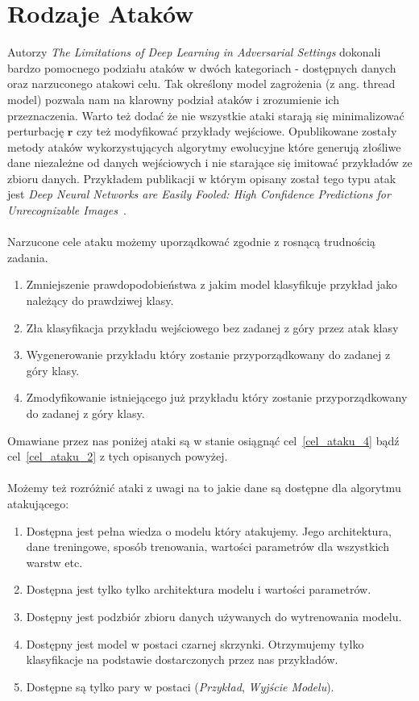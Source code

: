 \documentclass[
    left=2.5cm,         %
    right=2.5cm,        %
    top=2.5cm,          %
    bottom=3cm,         %
    bindingoffset=6mm,  %
    nohyphenation=false %
]{eiti/eiti-thesis}
\renewcommand{\vec}[1]{\mathbf{#1}}
\begin{document}
\section{Rodzaje Ataków}
Autorzy
\textit{The Limitations of Deep Learning in Adversarial Settings}\cite{DBLP:journals/corr/PapernotMJFCS15}
dokonali bardzo pomocnego podziału ataków w dwóch kategoriach - dostępnych danych oraz narzuconego atakowi celu. Tak określony
model zagrożenia (z ang. thread model) pozwala nam na klarowny podział ataków i zrozumienie ich przeznaczenia. Warto też dodać
że nie wszystkie ataki starają się minimalizować perturbację $\vec{r}$ czy też modyfikować przykłady wejściowe. Opublikowane zostały
metody ataków wykorzystujących algorytmy ewolucyjne które generują złośliwe dane niezależne od danych wejściowych i nie starające się
imitować przykładów ze zbioru danych. Przykładem publikacji w którym opisany został tego typu atak jest \textit{Deep Neural Networks are Easily Fooled: High Confidence Predictions for Unrecognizable Images}~\cite{DBLP:journals/corr/NguyenYC14}.
\\~\\
Narzucone cele ataku możemy uporządkować zgodnie z rosnącą trudnością zadania.
\begin{enumerate}
    \item Zmniejszenie prawdopodobieństwa z jakim model klasyfikuje przykład jako należący do prawdziwej klasy.
    \item \label{cel_ataku_2} Zła klasyfikacja przykładu wejściowego bez zadanej z góry przez atak klasy
    \item Wygenerowanie przykładu który zostanie przyporządkowany do zadanej z góry klasy.
    \item \label{cel_ataku_4} Zmodyfikowanie istniejącego już przykładu który zostanie przyporządkowany do zadanej z góry klasy.
\end{enumerate}
Omawiane przez nas poniżej ataki są w stanie osiągnąć cel~\ref{cel_ataku_4} bądź cel~\ref{cel_ataku_2} z tych opisanych powyżej.
\\~\\
Możemy też rozróżnić ataki z uwagi na to jakie dane są dostępne dla algorytmu atakującego:
\begin{enumerate}
    \item \label{atak_1} Dostępna jest pełna wiedza o modelu który atakujemy. Jego architektura, dane treningowe, sposób trenowania, wartości parametrów dla wszystkich warstw etc.
    \item \label{atak_2} Dostępna jest tylko tylko architektura modelu i wartości parametrów.
    \item Dostępny jest podzbiór zbioru danych używanych do wytrenowania modelu.
    \item Dostępny jest model w postaci czarnej skrzynki. Otrzymujemy tylko klasyfikacje na podstawie dostarczonych przez nas przykładów.
    \item Dostępne są tylko pary w postaci (\textit{Przykład}, \textit{Wyjście Modelu}).
\end{enumerate}
\end{document}
